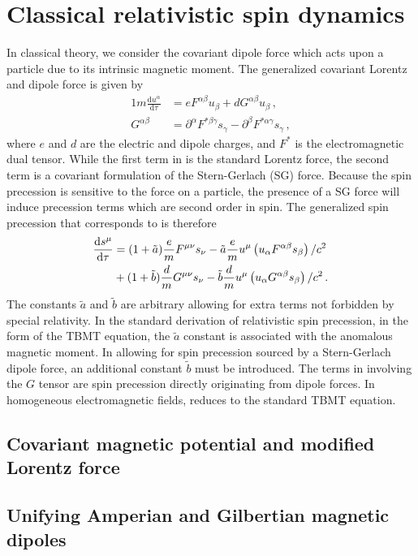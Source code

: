 \section{Classical relativistic spin dynamics}
\label{sec:cspin}
\noindent In classical theory, we consider the covariant dipole force which acts upon a particle due to its intrinsic magnetic moment. The generalized covariant Lorentz and dipole force is given by
\begin{alignat}{1}
  \label{LSG01} m\frac{\mathrm{d}u^{\alpha}}{\mathrm{d}\tau}&=eF^{\alpha\beta}u_{\beta}+dG^{\alpha\beta}u_{\beta}\,,\\
  \label{LSG02} G^{\alpha\beta}&=\partial^{\alpha}F^{*\beta\gamma}s_{\gamma}-\partial^{\beta}F^{*\alpha\gamma}s_{\gamma}\,,
\end{alignat}
where $e$ and $d$ are the electric and dipole charges, and $F^{*}$ is the electromagnetic dual tensor. While the first term in  is the standard Lorentz force, the second term is a covariant formulation of the Stern-Gerlach (SG) force. Because the spin precession is sensitive to the force on a particle, the presence of a SG force will induce precession terms which are second order in spin. The generalized spin precession that corresponds to  is therefore
\begin{alignat}{1}
  \notag\frac{\mathrm{d}s^{\mu}}{\mathrm{d}\tau}&=(1+\tilde{a})\frac{e}{m}F^{\mu\nu}s_{\nu}-\tilde{a}\frac{e}{m}u^{\mu}\left(u_{\alpha}F^{\alpha\beta}s_{\beta}\right)/c^{2}\\
  \label{LSG03}&+(1+\tilde{b})\frac{d}{m}G^{\mu\nu}s_{\nu}-\tilde{b}\frac{d}{m}u^{\mu}\left(u_{\alpha}G^{\alpha\beta}s_{\beta}\right)/c^{2}\,.
\end{alignat}
The constants $\tilde{a}$ and $\tilde{b}$ are arbitrary allowing for extra terms not forbidden by special relativity. In the standard derivation of relativistic spin precession, in the form of the TBMT equation, the $\tilde{a}$ constant is associated with the anomalous magnetic moment. In allowing for spin precession sourced by a Stern-Gerlach dipole force, an additional constant $\tilde{b}$ must be introduced. The terms in  involving the $G$ tensor are spin precession directly originating from dipole forces. In homogeneous electromagnetic fields,  reduces to the standard TBMT equation.
\subsection{Covariant magnetic potential and modified Lorentz force}
\label{sec:magpotential}
\subsection{Unifying Amperian and Gilbertian magnetic dipoles}
\label{sec:ampgil}
